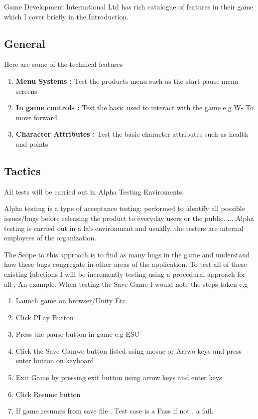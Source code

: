 Game Development International Ltd has rich catalogue of features in their game which I cover briefly in
the Introduction.
\subsection{General}
Here are some of the technical features
\begin{enumerate}
  \item    \textbf{Menu Systems :}  Test the products menu such as the start  pause menu screens
  \item    \textbf{In game controls :} Test the basic used to interact with the game e.g W- To move forward
  \item     \textbf{Character Attributes :} Test the basic character attributes such as health and points
\end{enumerate}


\subsection{Tactics}


All tests will be carried out in Alpha Testing Enviroments.


Alpha testing is a type of acceptance testing; performed to identify all possible issues/bugs before releasing the product to everyday users or the public. ... Alpha testing is carried out in a lab environment and usually, the testers are internal employees of the organization.


The Scope to this approach is to find as many
bugs in the game and understand how these bugs congregate in other areas of the application.
To test all of these existing fubctions I will be incremently testing using a procedural approach for all , An example. When testing the Save Game
I would note the steps taken e.g 

\begin{enumerate}
	\item  Launch game on browser/Unity Etc
	\item  Click PLay Button
	\item Press the pause button in game e.g ESC
	\item  Click the Save Gamwe button listed using mosue or Arrwo keys and press enter button on keyboard
	\item Exit Game by pressing exit button using arrow keys and enter keys 
	\item Click Resume button
	\item If game resumes from save file . Test case is a Pass if not , a fail.

\end{enumerate}

